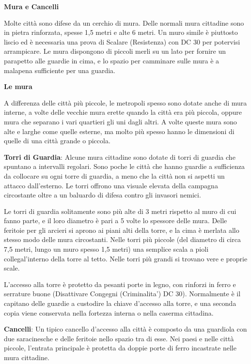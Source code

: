 \documentclass[a4paper,11pt,twoside,openany]{book}
\begin{document}
\textbf{Mura e Cancelli}

Molte città sono difese da un cerchio di mura. Delle normali mura cittadine sono in pietra rinforzata, spesse 1,5 metri e alte 6 metri. Un muro simile è piuttosto liscio ed è necessaria una prova di Scalare (Resistenza) con DC 30 per potervisi arrampicare. Le mura dispongono di piccoli merli su un lato per fornire un parapetto alle guardie in cima, e lo spazio per camminare sulle mura è a malapena sufficiente per una guardia.

\textbf{Le mura}

A differenza delle città più piccole, le metropoli spesso sono dotate anche di mura interne, a volte delle vecchie mura erette quando la città era più piccola, oppure mura che separano i vari quartieri gli uni dagli altri. A volte queste mura sono alte e larghe come quelle esterne, ma molto più spesso hanno le dimensioni di quelle di una città grande o piccola.

\textbf{Torri di Guardia}: Alcune mura cittadine sono dotate di torri di guardia che spuntano a intervalli regolari. Sono poche le città che hanno guardie a sufficienza da collocare su ogni torre di guardia, a meno che la città non si aspetti un attacco dall'esterno. Le torri offrono una visuale elevata della campagna circostante oltre a un baluardo di difesa contro gli invasori nemici.

Le torri di guardia solitamente sono più alte di 3 metri rispetto al muro di cui fanno parte, e il loro diametro è pari a 5 volte lo spessore delle mura. Delle feritoie per gli arcieri si aprono ai piani alti della torre, e la cima è merlata allo stesso modo delle mura circostanti. Nelle torri più piccole (del diametro di circa 7,5 metri, lungo un muro spesso 1,5 metri) una semplice scala a pioli collegal'interno della torre al tetto. Nelle torri più grandi si trovano vere e proprie scale.

L'accesso alla torre è protetto da pesanti porte in legno, con rinforzi in ferro e serrature buone (Disattivare Congegni (Criminalita') DC 30). Normalmente è il capitano delle guardie a custodire la chiave d'accesso alla torre, e una seconda copia viene conservata nella fortezza interna o nella caserma cittadina.

\textbf{Cancelli}: Un tipico cancello d'accesso alla città è composto da una guardiola con due saracinesche e delle feritoie nello spazio tra di esse. Nei paesi e nelle città piccole, l'entrata principale è protetta da doppie porte di ferro incastrate nelle mura cittadine.
\end{document}
